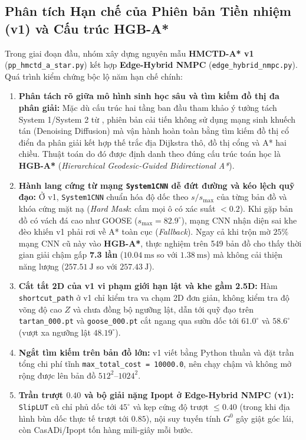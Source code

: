 \documentclass[12pt, a4paper]{article}
\begin{document}
\subsection{Phân tích Hạn chế của Phiên bản Tiền nhiệm (v1) và Cấu trúc HGB-A*}
Trong giai đoạn đầu, nhóm xây dựng nguyên mẫu \textbf{HMCTD-A* v1} (\texttt{pp\_hmctd\_a\_star.py}) kết hợp \textbf{Edge-Hybrid NMPC} (\texttt{edge\_hybrid\_nmpc.py}). Quá trình kiểm chứng bộc lộ năm hạn chế chính:
\begin{enumerate}
    \item \textbf{Phân tách rõ giữa mô hình sinh học sâu và tìm kiếm đồ thị đa phân giải:} Mặc dù cấu trúc hai tầng ban đầu tham khảo ý tưởng tách System 1/System 2 từ \cite{yoon2025}, phiên bản cải tiến không sử dụng mạng sinh khuếch tán (Denoising Diffusion) mà vận hành hoàn toàn bằng tìm kiếm đồ thị cổ điển đa phân giải kết hợp thế trắc địa Dijkstra thô, đồ thị cổng và A* hai chiều. Thuật toán do đó được định danh theo đúng cấu trúc toán học là \textbf{HGB-A*} (\textit{Hierarchical Geodesic-Guided Bidirectional A*}).
    \item \textbf{Hành lang cứng từ mạng \texttt{System1CNN} dễ đứt đường và kéo lệch quỹ đạo:} Ở v1, \texttt{System1CNN} chuẩn hóa độ dốc theo $s / s_{\max}$ của từng bản đồ và khóa cứng mặt nạ (\textit{Hard Mask}: cấm mọi ô có xác suất $<0.2$). Khi gặp bản đồ có vách đá cao như GOOSE ($s_{\max} = 82.9^\circ$), mạng CNN nhận diện sai khe đèo khiến v1 phải rơi về A* toàn cục (\textit{Fallback}). Ngay cả khi trộn mờ $25\%$ mạng CNN cũ này vào \textbf{HGB-A*}, thực nghiệm trên 549 bản đồ cho thấy thời gian giải chậm gấp \textbf{7.3 lần} ($10.04\ \text{ms}$ so với $1.38\ \text{ms}$) mà không cải thiện năng lượng ($257.51\ \text{J}$ so với $257.43\ \text{J}$).
    \item \textbf{Cắt tắt 2D của v1 vi phạm giới hạn lật và khe gầm 2.5D:} Hàm \texttt{shortcut\_path} ở v1 chỉ kiểm tra va chạm 2D đơn giản, không kiểm tra độ võng độ cao $Z$ và chưa đồng bộ ngưỡng lật, dẫn tới quỹ đạo trên \texttt{tartan\_000.pt} và \texttt{goose\_000.pt} cắt ngang qua sườn dốc tới $61.0^\circ$ và $58.6^\circ$ (vượt xa ngưỡng lật $48.19^\circ$).
    \item \textbf{Ngắt tìm kiếm trên bản đồ lớn:} v1 viết bằng Python thuần và đặt trần tổng chi phí tĩnh \texttt{max\_total\_cost = 10000.0}, nên chạy chậm và không mở rộng được lên bản đồ $512^2\text{--}1024^2$.
    \item \textbf{Trần trượt $0.40$ và bộ giải nặng Ipopt ở Edge-Hybrid NMPC (v1):} \texttt{SlipLUT} cũ chỉ phủ dốc tới $45^\circ$ và kẹp cứng độ trượt $\le 0.40$ (trong khi địa hình bùn dốc thực tế trượt tới $0.85$), nội suy tuyến tính $G^0$ gây giật góc lái, còn CasADi/Ipopt \cite{andersson2019, wachter2006} tốn hàng mili-giây mỗi bước.
\end{enumerate}
\end{document}
